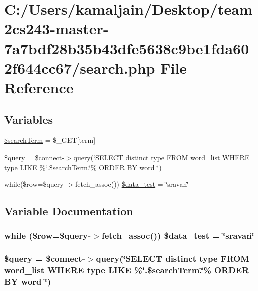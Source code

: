 \hypertarget{search_8php}{}\section{C\+:/\+Users/kamaljain/\+Desktop/team2cs243-\/master-\/7a7bdf28b35b43dfe5638c9be1fda602f644cc67/search.php File Reference}
\label{search_8php}
\subsection*{Variables}
\begin{DoxyCompactItemize}
\item 
\hyperlink{search_8php_a83ce06f839224573e9ffa6cfaf578a34}{\$search\+Term} = \$\+\_\+\+G\+ET\mbox{[}\textquotesingle{}term\textquotesingle{}\mbox{]}
\item 
\hyperlink{search_8php_af59a5f7cd609e592c41dc3643efd3c98}{\$query} = \$connect-\/$>$query(\char`\"{}S\+E\+L\+E\+CT distinct type F\+R\+OM word\+\_\+list W\+H\+E\+RE type L\+I\+KE \textquotesingle{}\%\char`\"{}.\$search\+Term.\char`\"{}\%\textquotesingle{} O\+R\+D\+ER BY word \char`\"{})
\item 
while(\$row=\$query-\/$>$fetch\+\_\+assoc()) \hyperlink{search_8php_a3070e4b5ecc72d681f45401647cd532a}{\$data\+\_\+test} = \char`\"{}sravan\char`\"{}
\end{DoxyCompactItemize}


\subsection{Variable Documentation}
\subsubsection[{\texorpdfstring{\$data\+\_\+test}{$data_test}}]{\setlength{\rightskip}{0pt plus 5cm}while (\$row=\$query-\/$>$fetch\+\_\+assoc()) \$data\+\_\+test = \char`\"{}sravan\char`\"{}}\hypertarget{search_8php_a3070e4b5ecc72d681f45401647cd532a}{}\label{search_8php_a3070e4b5ecc72d681f45401647cd532a}
\subsubsection[{\texorpdfstring{\$query}{$query}}]{\setlength{\rightskip}{0pt plus 5cm}\$query = \$connect-\/$>$query(\char`\"{}S\+E\+L\+E\+CT distinct type F\+R\+OM word\+\_\+list W\+H\+E\+RE type L\+I\+KE \textquotesingle{}\%\char`\"{}.\$search\+Term.\char`\"{}\%\textquotesingle{} O\+R\+D\+ER BY word \char`\"{})}\hypertarget{search_8php_af59a5f7cd609e592c41dc3643efd3c98}{}\label{search_8php_af59a5f7cd609e592c41dc3643efd3c98}
